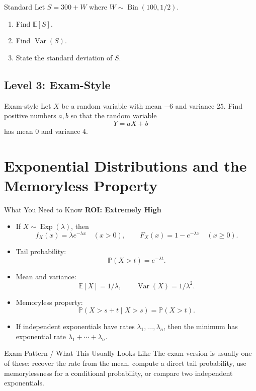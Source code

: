 \documentclass[12pt]{article}
\newcommand{\EE}{\mathbb{E}}
\newcommand{\PP}{\mathbb{P}}
\newcommand{\Var}{\operatorname{Var}}
\newcommand{\Bin}{\operatorname{Bin}}
\newcommand{\Exp}{\operatorname{Exp}}
\newcommand{\writespace}[1]{\vspace*{#1}}
\newcommand{\medws}{\writespace{1.8cm}}
\newcommand{\longws}{\writespace{2.8cm}}
\newcommand{\roiline}[1]{\textbf{ROI: #1}}
\newcounter{problem}[section]
\begin{document}
\begin{practiceproblem}{Standard}
Let $S=300+W$ where $W\sim\Bin(100,1/2)$.
\begin{enumerate}
  \item Find $\EE[S]$.
  \item Find $\Var(S)$.
  \item State the standard deviation of $S$.
\end{enumerate}
\end{practiceproblem}
\medws

\subsection*{Level 3: Exam-Style}

\begin{practiceproblem}{Exam-style}
Let $X$ be a random variable with mean $-6$ and variance $25$. Find positive numbers $a,b$ so that the random variable
\[
  Y=aX+b
\]
has mean $0$ and variance $4$.
\end{practiceproblem}
\longws

\clearpage

\section{Exponential Distributions and the Memoryless Property}

\begin{summarybox}{What You Need to Know}
\roiline{Extremely High}
\begin{itemize}
  \item If $X\sim\Exp(\lambda)$, then
  \[
    f_X(x)=\lambda e^{-\lambda x}\quad (x>0),
    \qquad
    F_X(x)=1-e^{-\lambda x}\quad (x\ge 0).
  \]
  \item Tail probability:
  \[
    \PP(X>t)=e^{-\lambda t}.
  \]
  \item Mean and variance:
  \[
    \EE[X]=1/\lambda,
    \qquad
    \Var(X)=1/\lambda^2.
  \]
  \item Memoryless property:
  \[
    \PP(X>s+t\mid X>s)=\PP(X>t).
  \]
  \item If independent exponentials have rates $\lambda_1,\dots,\lambda_n$, then the minimum has exponential rate $\lambda_1+\cdots+\lambda_n$.
\end{itemize}
\end{summarybox}

\begin{patternbox}{Exam Pattern / What This Usually Looks Like}
The exam version is usually one of these: recover the rate from the mean, compute a direct tail probability, use memorylessness for a conditional probability, or compare two independent exponentials.
\end{patternbox}
\end{document}
